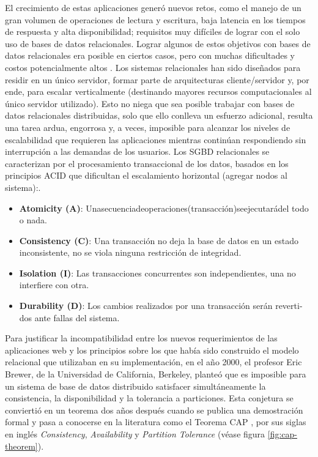 El crecimiento de estas aplicaciones generó nuevos retos, como el manejo de un gran volumen de operaciones de lectura y escritura, baja latencia en los tiempos de respuesta y alta disponibilidad; requisitos muy difíciles de lograr con el solo uso de bases de datos relacionales.
Lograr algunos de estos objetivos con bases de datos relacionales era posible en ciertos casos, pero con muchas dificultades y costos potencialmente altos \cite{strauch2011nosql}.
Los sistemas relacionales han sido diseñados para residir en un único servidor, formar parte de arquitecturas cliente/servidor y, por ende, para escalar verticalmente (destinando mayores recursos computacionales al único servidor utilizado). 
Esto no niega que sea posible trabajar con bases de datos relacionales distribuidas, 
solo que ello conlleva un esfuerzo adicional, resulta una tarea ardua, engorrosa y, a veces,
imposible para alcanzar los niveles de escalabilidad que requieren las aplicaciones mientras continúan respondiendo sin interrupción a las demandas de los usuarios.
Los SGBD relacionales se caracterizan por el procesamiento transaccional de los datos, basados en los principios ACID \cites*{strauch2011nosql,pokorny2011nosql} que dificultan el escalamiento horizontal (agregar nodos al sistema):.

\begin{itemize}
    \item \textbf{Atomicity (A)}: Unasecuenciadeoperaciones(transacción)seejecutarádel todo o nada.
    \item \textbf{Consistency (C)}: Una transacción no deja la base de datos en un estado inconsistente, no se viola ninguna restricción de integridad.
    \item \textbf{Isolation (I)}: Las transacciones concurrentes son independientes, una no interfiere con otra.
    \item \textbf{Durability (D)}: Los cambios realizados por una transacción serán reverti- dos ante fallas del sistema.
\end{itemize}


Para justificar la incompatibilidad entre los nuevos requerimientos de las aplicaciones web y los principios sobre los que había sido construido el
modelo relacional que utilizaban en su implementación, en el año 2000, el profesor Eric Brewer, de la Universidad de California, Berkeley, planteó que es imposible 
para un sistema de base de datos distribuido satisfacer simultáneamente la consistencia, la disponibilidad y la tolerancia a particiones. 
Esta conjetura se conviertió en un teorema dos años después cuando se publica una demostración formal y pasa a conocerse en la literatura como el Teorema CAP \cite{gilbert2012perspectives}, por sus siglas en inglés \textit{Consistency}, \textit{Availability} y \textit{Partition Tolerance} (véase figura \ref{fig:cap-theorem}).

